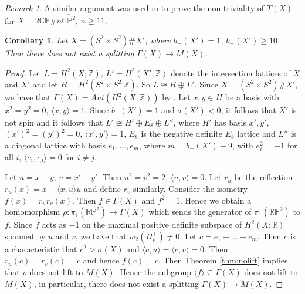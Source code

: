 \documentclass{amsart}
\newtheorem{corollary}[theorem]{Corollary}
\theoremstyle{definition}
\theoremstyle{remark}
\newtheorem{remark}[theorem]{Remark}
\numberwithin{equation}{section}
\begin{document}
\begin{remark}
A similar argument was used in \cite{kmt} to prove the non-triviality of $T(X)$ for $X = 2\mathbb{CP} \# n \overline{\mathbb{CP}^2}$, $n \ge 11$.
\end{remark}

\begin{corollary}
Let $X = (S^2 \times S^2) \# X'$, where $b_+(X') = 1$, $b_-(X') \ge 10$. Then there does not exist a splitting $\Gamma(X) \to M(X)$.
\end{corollary}
\begin{proof}
Let $L = H^2(X ; \mathbb{Z})$, $L' = H^2(X' ; \mathbb{Z})$ denote the intersection lattices of $X$ and $X'$ and let $H = H^2(S^2 \times S^2 \; \mathbb{Z})$. So $L \cong H \oplus L'$. Since $X = (S^2 \times S^2) \# X'$, we have that $\Gamma(X) = Aut( H^2(X ; \mathbb{Z}))$ by \cite{wall}. Let $x,y \in H$ be a basis with $x^2 = y^2 = 0$, $\langle x , y \rangle = 1$. Since $b_+(X') = 1$ and $\sigma(X') < 0$, it follows that $X'$ is not spin and it follows that $L' \cong H' \oplus E_8 \oplus L''$, where $H'$ has basis $x',y'$, $(x')^2 = (y')^2 = 0$, $\langle x' , y' \rangle = 1$, $E_8$ is the negative definite $E_8$ lattice and $L''$ is a diagonal lattice with basis $e_1 , \dots , e_m$, where $m = b_-(X')-9$, with $e_i^2 = -1$ for all $i$, $\langle e_i , e_j \rangle = 0$ for $i \neq j$.

Let $u = x+y$, $v = x'+y'$. Then $u^2 = v^2 = 2$, $\langle u , v \rangle = 0$. Let $r_u$ be the reflection $r_u(x) = x + \langle x , u \rangle u$ and define $r_v$ similarly. Consider the isometry $f(x) = r_u r_v(x)$. Then $f \in \Gamma(X)$ and $f^2 = 1$. Hence we obtain a homomorphism $\rho : \pi_1(\mathbb{RP}^2) \to \Gamma(X)$ which sends the generator of $\pi_1(\mathbb{RP}^2)$ to $f$. Since $f$ acts as $-1$ on the maximal positive definite subspace of $H^2(X ; \mathbb{R})$ spanned by $u$ and $v$, we have that $w_2( H^+_{\rho}) \neq 0$. Let $c = e_1 +  \dots + e_m$. Then $c$ is a characteristic that $c^2 > \sigma(X)$ and $\langle c , u \rangle = \langle c , v \rangle = 0$. Then $r_u(c) = r_v(c) = c$ and hence $f(c) = c$. Then Theorem \ref{thm:nolift} implies that $\rho$ does not lift to $M(X)$. Hence the subgroup $\langle f \rangle \subseteq \Gamma(X)$ does not lift to $M(X)$, in particular, there does not exist a splitting $\Gamma(X) \to M(X)$.
\end{proof}
\end{document}
